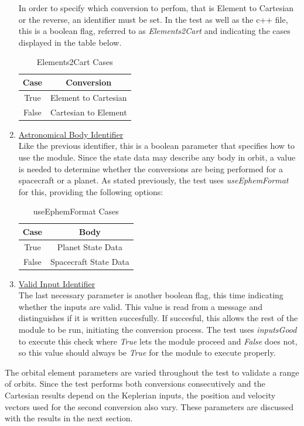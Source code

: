 \begin{enumerate}
	In order to specify which conversion to perfom, that is Element to Cartesian or the reverse, an identifier must be set. In the test as well as the c++ file, this is a boolean flag, referred to as \textit{Elements2Cart} and indicating the cases displayed in the table below.
	\begin{table}[htbp]
		\caption{Elements2Cart Cases}
		\centering \fontsize{10}{10}\selectfont
		\begin{tabular}{c|c}
			\hline \textbf{Case} & \textbf{Conversion}\\ \hline True & Element to Cartesian\\ False & Cartesian to Element\\
			\hline
		\end{tabular}
	\end{table}
	\item \underline{Astronomical Body Identifier}\\
	Like the previous identifier, this is a boolean parameter that specifies how to use the module. Since the state data may describe any body in orbit, a value is needed to determine whether the conversions are being performed for a spacecraft or a planet. As stated previously, the test uses \textit{useEphemFormat} for this, providing the following options:
	\begin{table}[htbp]
		\caption{useEphemFormat Cases}
		\centering \fontsize{10}{10}\selectfont
		\begin{tabular}{c|c}
			\hline \textbf{Case} & \textbf{Body}\\ \hline True & Planet State Data\\ False & Spacecraft State Data\\
			\hline
		\end{tabular}
	\end{table}
	\item \underline{Valid Input Identifier}\\
	The last necessary parameter is another boolean flag, this time indicating whether the inputs are valid. This value is read from a message and distinguishes if it is written succesfully. If succesful, this allows the rest of the module to be run, initiating the conversion process. The test uses \textit{inputsGood} to execute this check where \textit{True} lets the module proceed and \textit{False} does not, so this value should always be \textit{True} for the module to execute properly.
\end{enumerate}	
The orbital element parameters are varied throughout the test to validate a range of orbits. Since the test performs both conversions consecutively and the Cartesian results depend on the Keplerian inputs, the position and velocity vectors used for the second conversion also vary. These parameters are discussed with the results in the next section.
